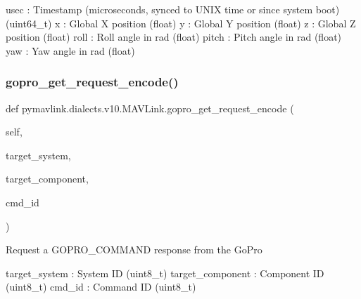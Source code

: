 \begin{DoxyVerb}
\begin{DoxyVerb}
\begin{DoxyVerb}usec                      : Timestamp (microseconds, synced to UNIX time or since system boot) (uint64_t)
x                         : Global X position (float)
y                         : Global Y position (float)
z                         : Global Z position (float)
roll                      : Roll angle in rad (float)
pitch                     : Pitch angle in rad (float)
yaw                       : Yaw angle in rad (float)\end{DoxyVerb}
 \mbox{\label{classpymavlink_1_1dialects_1_1v10_1_1MAVLink_a8eba1b59ef90a02f95ddab006fb5ca43}} 
\subsubsection{\texorpdfstring{gopro\+\_\+get\+\_\+request\+\_\+encode()}{gopro\_get\_request\_encode()}}
{\footnotesize\ttfamily def pymavlink.\+dialects.\+v10.\+M\+A\+V\+Link.\+gopro\+\_\+get\+\_\+request\+\_\+encode (\begin{DoxyParamCaption}\item[{}]{self,  }\item[{}]{target\+\_\+system,  }\item[{}]{target\+\_\+component,  }\item[{}]{cmd\+\_\+id }\end{DoxyParamCaption})}

\begin{DoxyVerb}Request a GOPRO_COMMAND response from the GoPro

target_system             : System ID (uint8_t)
target_component          : Component ID (uint8_t)
cmd_id                    : Command ID (uint8_t)\end{DoxyVerb}
 \mbox{\label{classpymavlink_1_1dialects_1_1v10_1_1MAVLink_ab33a6a1e8880d70e99b690567b153e11}} 

\end{DoxyVerb}
\end{DoxyVerb}
